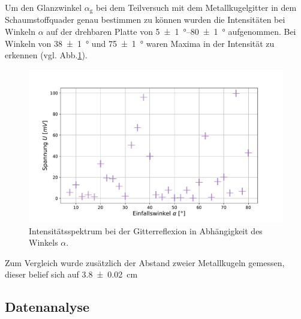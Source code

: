 		Um den Glanzwinkel $\alpha_\text{g}$ bei dem Teilversuch mit dem Metallkugelgitter in dem Schaumstoffquader genau bestimmen zu können wurden die Intensitäten bei Winkeln $\alpha$ auf der drehbaren Platte von \SIrange{5+-1}{80+-1}{\degree} aufgenommen.
		Bei Winkeln von \SI{38+-1}{\degree} und \SI{75+-1}{\degree} waren Maxima in der Intensität zu erkennen (vgl. Abb.\ref{fig:braggwinkel}).
		\begin{figure}[ht]
			\centering
			\includegraphics[width=\textwidth]{data/schaumstoff.pdf}
			\caption{Intensitätsspektrum bei der Gitterreflexion in Abhängigkeit des Winkels $\alpha$.}
			\label{fig:braggwinkel}	
		\end{figure}
		Zum Vergleich wurde zusätzlich der Abstand zweier Metallkugeln gemessen, dieser belief sich auf \SI{3,8+-0,02}{\centi\meter} 
		
	\subsection{Datenanalyse}
		
